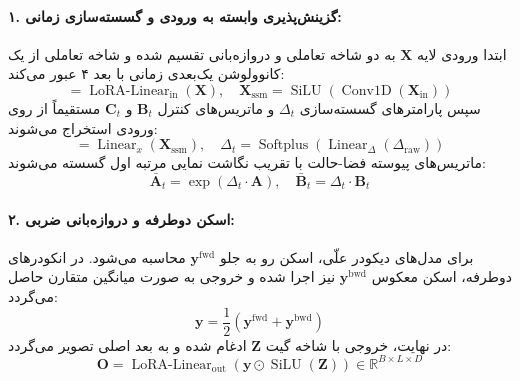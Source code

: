 \paragraph{۱. گزینش‌پذیری وابسته به ورودی و گسسته‌سازی زمانی:}
ابتدا ورودی لایه $\mathbf{X}$ به دو شاخه تعاملی و دروازه‌بانی تقسیم شده و شاخه تعاملی از یک کانوولوشن یک‌بعدی زمانی با بعد ۴ عبور می‌کند:
\begin{equation}
[\mathbf{X}_{\text{in}}, \mathbf{Z}] = \operatorname{LoRA-Linear}_{\text{in}}(\mathbf{X}), \quad \mathbf{X}_{\text{ssm}} = \operatorname{SiLU}(\operatorname{Conv1D}(\mathbf{X}_{\text{in}}))
\end{equation}
سپس پارامترهای گسسته‌سازی $\Delta_t$ و ماتریس‌های کنترل $\mathbf{B}_t$ و $\mathbf{C}_t$ مستقیماً از روی ورودی استخراج می‌شوند:
\begin{equation}
[\Delta_{\text{raw}}, \mathbf{B}_t, \mathbf{C}_t] = \operatorname{Linear}_x(\mathbf{X}_{\text{ssm}}), \quad \Delta_t = \operatorname{Softplus}(\operatorname{Linear}_{\Delta}(\Delta_{\text{raw}}))
\end{equation}
ماتریس‌های پیوسته فضا-حالت با تقریب نگاشت نمایی مرتبه اول گسسته می‌شوند:
\begin{equation}
\bar{\mathbf{A}}_t = \exp(\Delta_t \cdot \mathbf{A}), \quad \bar{\mathbf{B}}_t = \Delta_t \cdot \mathbf{B}_t
\end{equation}

\paragraph{۲. اسکن دوطرفه و دروازه‌بانی ضربی:}
برای مدل‌های دیکودر علّی، اسکن رو به جلو $\mathbf{y}^{\text{fwd}}$ محاسبه می‌شود. در انکودرهای دوطرفه، اسکن معکوس $\mathbf{y}^{\text{bwd}}$ نیز اجرا شده و خروجی به صورت میانگین متقارن حاصل می‌گردد:
\begin{equation}
\mathbf{y} = \frac{1}{2}\left(\mathbf{y}^{\text{fwd}} + \mathbf{y}^{\text{bwd}}\right)
\end{equation}
در نهایت، خروجی با شاخه گیت $\mathbf{Z}$ ادغام شده و به بعد اصلی تصویر می‌گردد:
\begin{equation}
\mathbf{O} = \operatorname{LoRA-Linear}_{\text{out}}(\mathbf{y} \odot \operatorname{SiLU}(\mathbf{Z})) \in \mathbb{R}^{B \times L \times D}
\end{equation}

